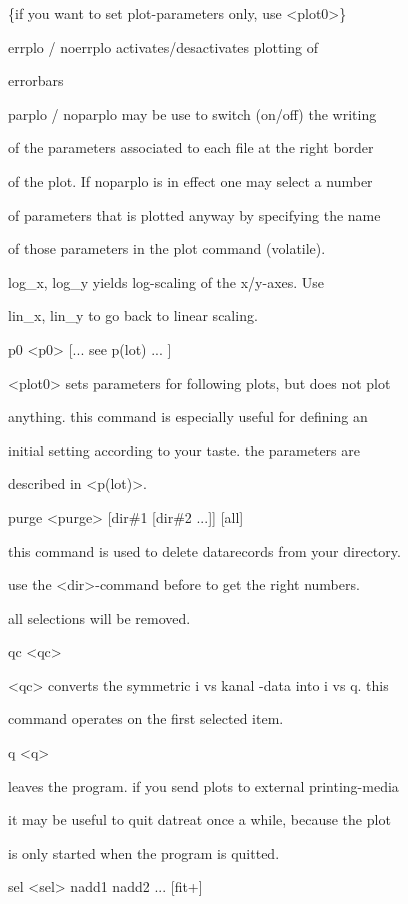 \documentclass[]{article}
\begin{document}
\{if you want to set plot-parameters only, use
\textless{}plot0\textgreater{}\}

errplo / noerrplo activates/desactivates plotting of

errorbars

parplo / noparplo may be use to switch (on/off) the writing

of the parameters associated to each file at the right border

of the plot. If noparplo is in effect one may select a number

of parameters that is plotted anyway by specifying the name

of those parameters in the plot command (volatile).

log\_x, log\_y yields log-scaling of the x/y-axes. Use

lin\_x, lin\_y to go back to linear scaling.

p0 \textless{}p0\textgreater{} {[}... see p(lot) ... {]}

\textless{}plot0\textgreater{} sets parameters for following plots, but
does not plot

anything. this command is especially useful for defining an

initial setting according to your taste. the parameters are

described in \textless{}p(lot)\textgreater{}.

purge \textless{}purge\textgreater{} {[}dir\#1 {[}dir\#2 ...{]}{]}
\textbar{} {[}all{]}

this command is used to delete datarecords from your directory.

use the \textless{}dir\textgreater{}-command before to get the right
numbers.

all selections will be removed.

qc \textless{}qc\textgreater{}

\textless{}qc\textgreater{} converts the symmetric i vs kanal -data into
i vs q. this

command operates on the first selected item.

q \textless{}q\textgreater{}

leaves the program. if you send plots to external printing-media

it may be useful to quit datreat once a while, because the plot

is only started when the program is quitted.

sel \textless{}sel\textgreater{} nadd1 nadd2 ... {[}fit+{]}
\end{document}
